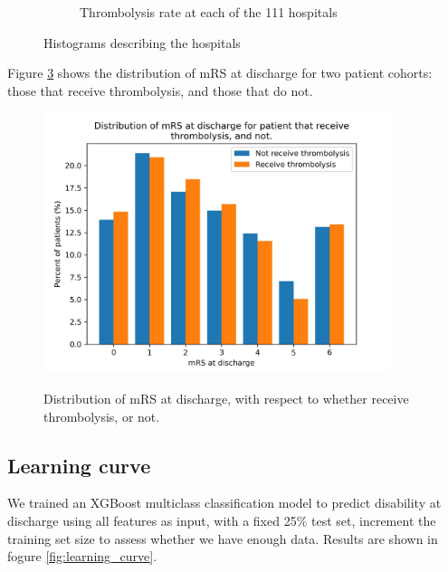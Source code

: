 \begin{figure}
\begin{subfigure}{.5\textwidth}
        \caption{Thrombolysis rate at each of the 111 hospitals}
        \label{fig:thrombolysis_rate}
    \end{subfigure}
    \caption{Histograms describing the hospitals}
\end{figure}

Figure \ref{fig:mrs_dist_wrt_ivt_bar} shows the distribution of mRS at discharge for two patient cohorts: those that receive thrombolysis, and those that do not.

\begin{figure}[h!]
    \centering
    {\includegraphics[width = 4in]{./images/000_ssnap_descriptive_stats_mrs_distribution_wrt_ivt.jpg}}\\
    \caption{Distribution of mRS at discharge, with respect to whether receive thrombolysis, or not.}
    \label{fig:mrs_dist_wrt_ivt_bar}
\end{figure}

\subsection{Learning curve}

We trained an XGBoost multiclass classification model to predict disability at discharge using all features as input, with a fixed 25\% test set, increment the training set size to assess whether we have enough data. Results are shown in fogure \ref{fig:learning_curve}.

